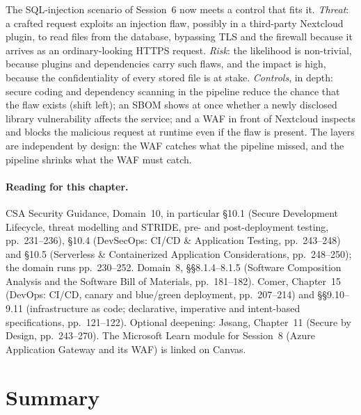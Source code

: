 \begin{example}\label{ex:waf-trc}
The SQL-injection scenario of Session~6 now meets a control that fits it. \emph{Threat}: a crafted request exploits an injection flaw, possibly in a
third-party Nextcloud plugin, to read files from the database, bypassing TLS
and the firewall because it arrives as an ordinary-looking HTTPS request.
\emph{Risk}: the likelihood is non-trivial, because plugins and dependencies
carry such flaws, and the impact is high, because the confidentiality of every
stored file is at stake. \emph{Controls}, in depth: secure coding and dependency scanning in the
pipeline reduce the chance that the flaw exists (shift left); an SBOM shows
at once whether a newly disclosed library vulnerability affects the service;
and a WAF in front of Nextcloud inspects and blocks the malicious request at
runtime even if the flaw is present. The layers are independent by design: the WAF catches what the
pipeline missed, and the pipeline shrinks what the WAF must catch.
\end{example}

\paragraph{Reading for this chapter.} CSA Security Guidance, Domain~10, in
particular \S10.1 (Secure Development Lifecycle, threat modelling and
STRIDE, pre- and post-deployment testing, pp.~231--236), \S10.4 (DevSecOps:
CI/CD \& Application Testing, pp.~243--248) and \S10.5 (Serverless \&
Containerized Application Considerations, pp.~248--250); the domain runs
pp.~230--252. Domain~8, \S\S8.1.4--8.1.5 (Software Composition Analysis and
the Software Bill of Materials, pp.~181--182). Comer, Chapter~15 (DevOps:
CI/CD, canary and blue/green deployment, pp.~207--214) and \S\S9.10--9.11
(infrastructure as code; declarative, imperative and intent-based
specifications, pp.~121--122). Optional deepening: J\o sang, Chapter~11
(Secure by Design, pp.~243--270). The Microsoft Learn module for Session~8 (Azure
Application Gateway and its WAF) is linked on Canvas.

\section{Summary}

